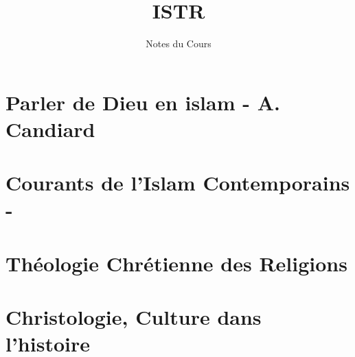 \documentclass[oneside,10pt]{book} %
\title{ISTR}
\author{Notes du Cours}
\begin{document}


\maketitle



\setcounter{page}{1}
\begin{fullwidth}
\tableofcontents
\end{fullwidth}

\setcounter{page}{1}
 
\mainmatter

%
%
\part{Parler de Dieu en islam - A. Candiard}
 
\part{Courants de l'Islam Contemporains - }







\part{Théologie Chrétienne des Religions}




\part{Christologie, Culture dans l'histoire}


 


\backmatter

%
%
\printbibliography

\listoftheorems[ignoreall,show={Def}]

\end{document}
